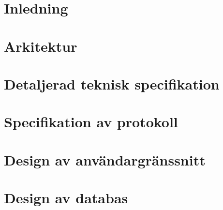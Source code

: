 \pagestyle{plain}
\setcounter{page}{1}

\chapter{Inledning}


\chapter{Arkitektur}


\chapter{Detaljerad teknisk specifikation}


\chapter{Specifikation av protokoll}


\chapter{Design av användargränssnitt}


\chapter{Design av databas}


%
